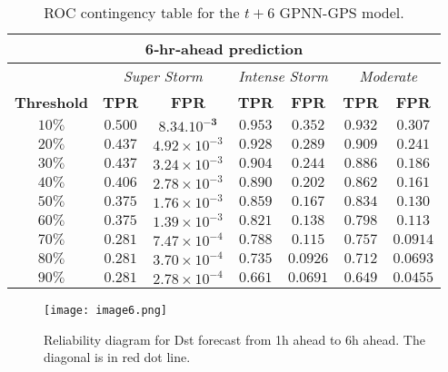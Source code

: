 \begin{table}[ht]
	\centering
	\caption{ROC contingency table for the $t+6$ GPNN-GPS model.}
	\label{table:rocgpnn6h}
	\begin{tabular}
		{c| c c | c c | c c}
		\hline
		\multicolumn{7}{c}{\textbf{6‐hr‐ahead prediction}} \\ 
		\hline
		 & \multicolumn{2}{c}{\textit{Super Storm}} & \multicolumn{2}{c}{\textit{Intense Storm}} & \multicolumn{2}{c}{\textit{Moderate}} \\ 
		\hline
		\textbf{Threshold} & \textbf{TPR} & \textbf{FPR} & \textbf{TPR} & \textbf{FPR} & \textbf{TPR} & \textbf{FPR} \\ 
		\hline
		$ 10\%$ & $\mathbf{0.500}$ & $\mathbf{8.34.10^{-3}}$ & $ 0.953 $ & $ 0.352 $ & $ 0.932 $ & $ 0.307 $ \\ 
		$ 20\%$ & $ 0.437 $ & $4.92\times10^{-3}$ & $ 0.928 $ & $ 0.289 $ & $ 0.909 $ & $ 0.241 $ \\ 
		$ 30\%$ & $ 0.437 $ & $3.24\times10^{-3}$ & $ 0.904 $ & $ 0.244 $ & $ 0.886 $ & $ 0.186 $ \\ 
		$ 40\%$ & $ 0.406 $ & $2.78\times10^{-3}$ & $ 0.890 $ & $ 0.202 $ & $ 0.862 $ & $ 0.161 $ \\ 
		$ 50\%$ & $ 0.375 $ & $1.76\times10^{-3}$ & $\mathbf{0.859}$ & $\mathbf{0.167}$ & $\mathbf{0.834}$ & $\mathbf{0.130}$\\ 
		$ 60\%$ & $ 0.375 $ & $1.39\times10^{-3}$ & $ 0.821 $ & $ 0.138 $ & $ 0.798 $ & $ 0.113 $ \\ 
		$ 70\%$ & $ 0.281 $ & $7.47\times10^{-4}$ & $ 0.788 $ & $ 0.115 $ & $ 0.757 $ & $ 0.0914 $ \\ 
		$ 80\%$ & $ 0.281 $ & $3.70\times10^{-4}$ & $ 0.735 $ & $ 0.0926 $ & $ 0.712 $ & $ 0.0693 $ \\ 
		$ 90\%$ & $ 0.281 $ & $2.78\times10^{-4}$ & $ 0.661 $ & $ 0.0691 $ & $ 0.649 $ & $ 0.0455 $ \\
		\hline
	\end{tabular}
\end{table}





\begin{figure}
	\texttt{[image: image6.png]}
	\caption{Reliability diagram for Dst forecast from 1h ahead to 6h ahead. The diagonal is in red dot line.}
	\label{fig:gpnnreliability}
\end{figure}


